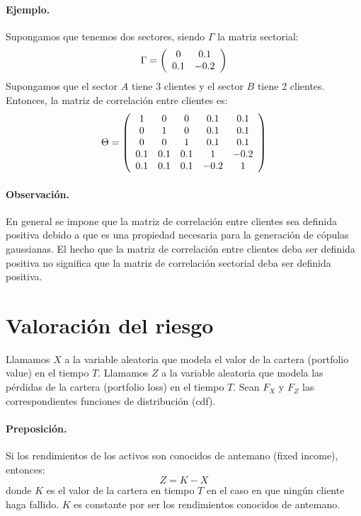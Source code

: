 \paragraph{Ejemplo.}Supongamos que tenemos dos sectores, siendo $\Gamma$ la
matriz sectorial:
\begin{displaymath}
\Gamma=\left(
\begin{array}{cc}
 0  &  0.1 \cr
0.1 & -0.2
\end{array}
\right)
\end{displaymath}
Supongamos que el sector $A$ tiene 3 clientes y el sector $B$ tiene 2 clientes.
Entonces, la matriz de correlaci\'on entre clientes es:
\begin{displaymath}
\Theta = \left(
\begin{array}{ccccc}
  1  &  0  &  0    &  0.1 &  0.1 \cr
  0  &  1  &  0    &  0.1 &  0.1 \cr
  0  &  0  &  1    &  0.1 &  0.1 \cr
 0.1 & 0.1 &  0.1  &  1   & -0.2 \cr
 0.1 & 0.1 &  0.1  & -0.2 &  1
\end{array}
\right)
\end{displaymath}


\paragraph{Observaci\'on.}  En general se impone
que la matriz de correlaci\'on entre clientes sea definida positiva
debido a que es una propiedad necesaria para la generaci\'on de c\'opulas
gaussianas. El hecho que la matriz de correlaci\'on entre clientes deba ser
definida positiva no significa que la matriz de correlaci\'on sectorial
deba ser definida positiva.


\section{Valoraci\'on del riesgo}

Llamamos $X$ a la variable aleatoria que modela el valor de la cartera
(portfolio value) en el tiempo $T$. Llamamos $Z$ a la variable aleatoria
que modela las p\'erdidas de la cartera (portfolio loss) en el tiempo $T$.
Sean $F_X$ y $F_Z$ las correspondientes funciones de distribuci\'on (cdf).

\paragraph{Preposici\'on.} Si los rendimientos de los activos son conocidos
de antemano (fixed income), entonces:
\begin{displaymath}
Z = K - X
\end{displaymath}
donde $K$ es el valor de la cartera en tiempo $T$ en el caso en que ning\'un
cliente haga fallido. $K$ es constante por ser los rendimientos conocidos de
antemano.

